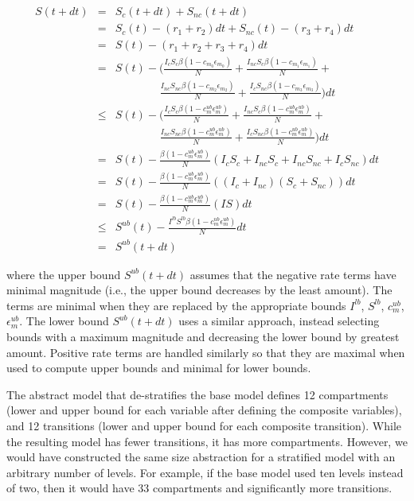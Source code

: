 \begin{eqnarray*}
    S(t+dt) &=& S_c(t+dt) + S_{nc}(t+dt)\\
    &=& S_c(t) - (r_1+ r_2)dt  + S_{nc}(t) - (r_3+ r_4)dt\\
    &=& S(t) - (r_1+ r_2 +r_3+ r_4)dt\\
    &=& S(t) - \biggl(\frac{I_c S_c \beta(1-c_{m_0}\epsilon_{m_0})}{N}+\frac{I_{nc} S_c \beta(1-c_{m_1}\epsilon_{m_1} )}{N}+\\
    &&\qquad\qquad\frac{I_{nc} S_{nc} \beta(1-c_{m_2}\epsilon_{m_2} )}{N}+\frac{I_c S_{nc} \beta(1-c_{m_3}\epsilon_{m_3} )}{N}\biggl)dt\\
    &\leq& S(t) - \biggl(\frac{I_c S_c \beta(1-c^{ub}_{m}\epsilon^{ub}_{m}  )}{N}+\frac{I_{nc} S_c \beta(1-c^{ub}_{m}\epsilon^{ub}_{m})}{N}+\\
    &&\qquad\qquad\frac{I_{nc} S_{nc} \beta(1-c^{ub}_{m}\epsilon^{ub}_{m})}{N}+\frac{I_c S_{nc} \beta(1-c^{ub}_{m}\epsilon^{ub}_{m} )}{N}\biggl)dt\\
    &=& S(t) - \frac{\beta(1-c^{ub}_{m}\epsilon^{ub}_{m} )}{N}(I_c S_c +I_{nc} S_c +I_{nc} S_{nc} +I_c S_{nc} )dt\\
    &=& S(t) - \frac{\beta(1-c^{ub}_{m}\epsilon^{ub}_{m} )}{N}((I_c+I_{nc}) (S_c + S_{nc}) )dt\\
    &=& S(t) - \frac{\beta(1-c^{ub}_{m}\epsilon^{ub}_{m} )}{N}(IS)dt\\
    &\leq& S^{ub}(t) - \frac{I^{lb}S^{lb}\beta(1-c^{ub}_{m}\epsilon^{ub}_{m} )}{N}dt\\
    &=& S^{ub}(t+dt)
\end{eqnarray*}

\noindent where the upper bound $S^{ub}(t+dt)$ assumes that the negative rate terms have minimal magnitude (i.e., the upper bound decreases by the least amount). The terms are minimal when they are replaced by the appropriate bounds $I^{lb}$, $S^{lb}$, $c^{ub}_{m}$, $\epsilon^{ub}_{m}$.  The lower bound $S^{ub}(t+dt)$ uses a similar approach, instead selecting bounds with a maximum magnitude and decreasing the lower bound by greatest amount.  Positive rate terms are handled similarly so that they are maximal when used to compute upper bounds and minimal for lower bounds.

The abstract model that de-stratifies the base model defines 12 compartments (lower and upper bound for each variable after defining the composite variables), and 12 transitions (lower and upper bound for each composite transition).  While the resulting model has fewer transitions, it has more compartments.  However, we would have constructed the same size abstraction for a stratified model with an arbitrary number of levels.  For example, if the base model used ten levels instead of two, then it would have 33 compartments and significantly more transitions.  

